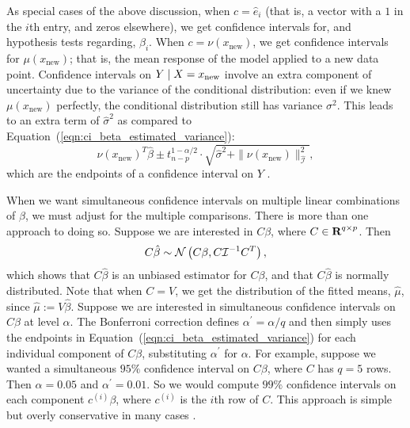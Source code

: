 \documentclass[12pt]{article}
\begin{document}
As special cases of the above discussion, when $c = \hat{e}_i$ (that is, a vector with a $1$ in the $i$th entry, and zeros elsewhere), we get confidence intervals for, and hypothesis tests regarding, $\beta_i$. When $c = \nu(x_\textrm{new})$, we get confidence intervals for $\mu(x_\textrm{new})$; that is, the mean response of the model applied to a new data point. Confidence intervals on $Y \; | \; X = x_\textrm{new}$ involve an extra component of uncertainty due to the variance of the conditional distribution: even if we knew $\mu(x_\textrm{new})$ perfectly, the conditional distribution still has variance $\sigma^2$. This leads to an extra term of $\hat{\sigma}^2$ as compared to Equation~(\ref{eqn:ci_beta_estimated_variance}):
\begin{equation}\label{eqn:prediction_interval}
\nu(x_\textrm{new})^T \hat{\beta} \pm t_{n-p}^{1-\alpha/2} \cdot \sqrt{\hat{\sigma}^2 + \| \nu(x_\textrm{new}) \|_{\hat{\mathcal{I}}}^2},
\end{equation}
which are the endpoints of a confidence interval on $Y$ \cite[\S 3.6]{Weisberg:2005}.

When we want simultaneous confidence intervals on multiple linear combinations of $\beta$, we must adjust for the multiple comparisons. There is more than one approach to doing so. Suppose we are interested in $C \beta$, where $C \in {\mbox{\bf R}}^{q \times p}$. Then
\begin{displaymath}
    C \hat{\beta} \sim {\mathcal N} \left( C \beta, C \mathcal{I}^{-1} C^T \right),
\end{displaymath}
which shows that $C \hat{\beta}$ is an unbiased estimator for $C \beta$, and that $C \hat{\beta}$ is normally distributed. Note that when $C = V$, we get the distribution of the fitted means, $\hat{\mu}$, since $\hat{\mu} := V \hat{\beta}$. Suppose we are interested in simultaneous confidence intervals on $C\beta$ at level $\alpha$. The Bonferroni correction defines $\alpha^\prime = \alpha / q$ and then simply uses the endpoints in Equation~(\ref{eqn:ci_beta_estimated_variance}) for each individual component of $C\beta$, substituting $\alpha^\prime$ for $\alpha$. For example, suppose we wanted a simultaneous $95\%$ confidence interval on $C\beta$, where $C$ has $q=5$ rows. Then $\alpha = 0.05$ and $\alpha^\prime = 0.01$. So we would compute $99\%$ confidence intervals on each component $c^{(i)} \beta$, where $c^{(i)}$ is the $i$th row of $C$. This approach is simple but overly conservative in many cases \cite[\S~9.1.3]{Weisberg:2005}.
\end{document}
